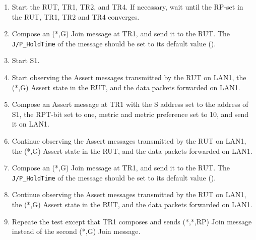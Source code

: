 \documentclass[11pt]{report}
\begin{document}
\begin{enumerate}

  \item Start the RUT, TR1, TR2, and TR4. If necessary, wait until the RP-set
  in the RUT, TR1, TR2 and TR4 converges.

  \item Compose an (*,G) Join message at TR1, and send it to the RUT.
  The \verb=J/P_HoldTime= of the message should be set to its default
  value ({\PimsmJPHoldTime}).

  \item Start S1.

  \item Start observing the Assert messages transmitted by the RUT on
  LAN1, the (*,G) Assert state in the RUT, and the data packets forwarded on
  LAN1. 

  \item Compose an Assert message at TR1 with the S address set to the
  address of S1, the RPT-bit set to one, metric and metric preference set to
  10, and send it on LAN1.

  \item Continue observing the Assert messages transmitted by the RUT on
  LAN1, the (*,G) Assert state in the RUT, and the data packets forwarded on
  LAN1.

  \item Compose an (*,G) Join message at TR1, and send it to the RUT.
  The \verb=J/P_HoldTime= of the message should be set to its default
  value ({\PimsmJPHoldTime}).

  \item Continue observing the Assert messages transmitted by the RUT on
  LAN1, the (*,G) Assert state in the RUT, and the data packets forwarded on
  LAN1.

  \item Repeate the test except that TR1 composes and sends (*,*,RP) Join
  message instead of the second (*,G) Join message.

\end{enumerate}

\end{document}
